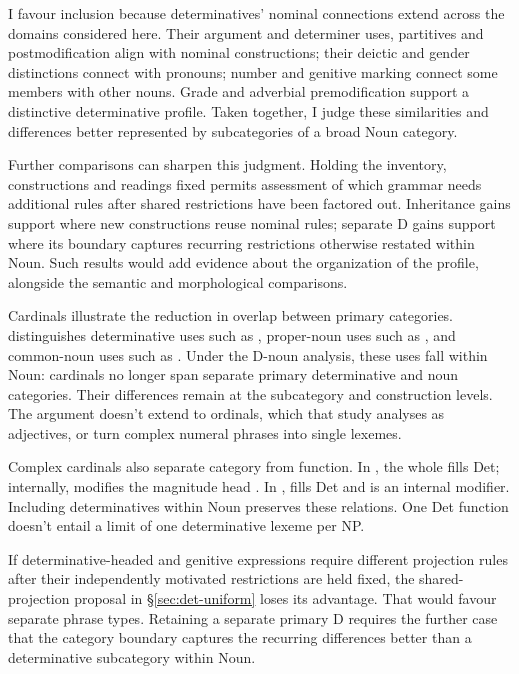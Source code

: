 \documentclass[12pt]{article}
\begin{document}
I favour inclusion because determinatives' nominal connections extend across the domains considered here. Their argument and determiner uses, partitives and postmodification align with nominal constructions; their deictic and gender distinctions connect with pronouns; number and genitive marking connect some members with other nouns. Grade and adverbial premodification support a distinctive determinative profile. Taken together, I judge these similarities and differences better represented by subcategories of a broad Noun category.

Further comparisons can sharpen this judgment. Holding the inventory, constructions and readings fixed permits assessment of which grammar needs additional rules after shared restrictions have been factored out. Inheritance gains support where new constructions reuse nominal rules; separate D gains support where its boundary captures recurring restrictions otherwise restated within Noun. Such results would add evidence about the organization of the profile, alongside the semantic and morphological comparisons.

Cardinals illustrate the reduction in overlap between primary categories. \textcite{reynolds2026numerals} distinguishes determinative uses such as , proper-noun uses such as , and common-noun uses such as . Under the D-noun analysis, these uses fall within Noun: cardinals no longer span separate primary determinative and noun categories. Their differences remain at the subcategory and construction levels. The argument doesn't extend to ordinals, which that study analyses as adjectives, or turn complex numeral phrases into single lexemes.

Complex cardinals also separate category from function. In , the whole  fills Det; internally,  modifies the magnitude head  \citep[§4]{reynolds2026numerals}. In ,  fills Det and  is an internal modifier. Including determinatives within Noun preserves these relations. One Det function doesn't entail a limit of one determinative lexeme per NP.

If determinative-headed and genitive expressions require different projection rules after their independently motivated restrictions are held fixed, the shared-projection proposal in §\ref{sec:det-uniform} loses its advantage. That would favour separate phrase types. Retaining a separate primary D requires the further case that the category boundary captures the recurring differences better than a determinative subcategory within Noun.
\end{document}

